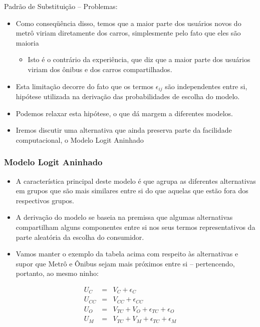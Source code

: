 \documentclass{beamer}
\begin{document}
\begin{frame}{Padrão de Substituição -- Problemas:}

\begin{itemize}
\item Como conseqüência disso, temos que a maior parte dos usuários novos
do metrô viriam diretamente dos carros, simplesmente pelo fato que
eles são maioria

\begin{itemize}
\item Isto é o contrário da experiência, que diz que a maior parte dos usuários
viriam dos ônibus e dos carros compartilhados.
\end{itemize}
\item Esta limitação decorre do fato que os termos $\epsilon_{ij}$ são
independentes entre si, hipótese utilizada na derivação das probabilidades
de escolha do modelo. 
\item Podemos relaxar esta hipótese, o que dá margem a diferentes modelos. 
\item Iremos discutir uma alternativa que ainda preserva parte da facilidade
computacional, o Modelo Logit Aninhado
\end{itemize}
\end{frame}

\begin{frame}\frametitle{Modelo Logit Aninhado}

\begin{itemize}
\item A característica principal deste modelo é que agrupa as diferentes
alternativas em grupos que são mais similares entre si do que aquelas
que estão fora dos respectivos grupos.
\item A derivação do modelo se baseia na premissa que algumas alternativas
compartilham alguns componentes entre si nos seus termos representativos
da parte aleatória da escolha do consumidor. 
\item Vamos manter o exemplo da tabela acima com respeito às alternativas
e supor que Metrô e Ônibus sejam mais próximos entre si --
pertencendo, portanto, ao mesmo ninho:
\end{itemize}
\begin{eqnarray*}
U_{C} & = & V_{C}+\epsilon_{C}\\
U_{CC} & = & V_{CC}+\epsilon_{CC}\\
U_{O} & = & V_{TC}+V_{O}+\epsilon_{TC}+\epsilon_{O}\\
U_{M} & = & V_{TC}+V_{M}+\epsilon_{TC}+\epsilon_{M}
\end{eqnarray*}

\end{frame}
\end{document}

